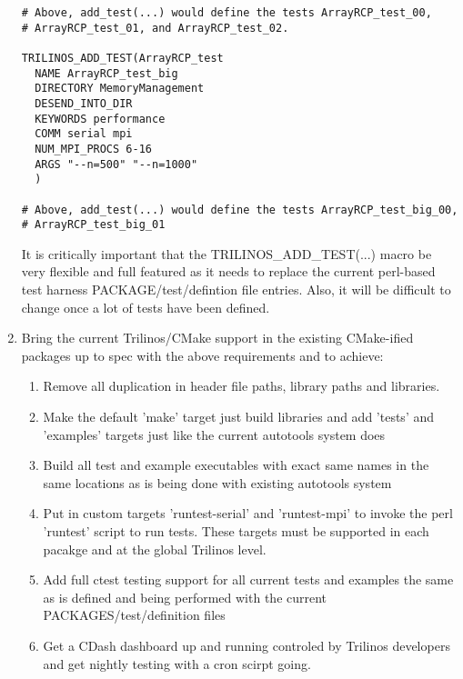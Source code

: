 \documentclass[pdf,ps2pdf,11pt]{SANDreport}
\begin{document}
\begin{enumerate}
\begin{verbatim}
# Above, add_test(...) would define the tests ArrayRCP_test_00,
# ArrayRCP_test_01, and ArrayRCP_test_02.

TRILINOS_ADD_TEST(ArrayRCP_test
  NAME ArrayRCP_test_big
  DIRECTORY MemoryManagement
  DESEND_INTO_DIR
  KEYWORDS performance
  COMM serial mpi
  NUM_MPI_PROCS 6-16
  ARGS "--n=500" "--n=1000"
  )

# Above, add_test(...) would define the tests ArrayRCP_test_big_00,
# ArrayRCP_test_big_01

\end{verbatim}

It is critically important that the TRILINOS\_ADD\_TEST(...) macro be
very flexible and full featured as it needs to replace the current
perl-based test harness PACKAGE/test/defintion file entries.  Also, it
will be difficult to change once a lot of tests have been defined.

{}\item Bring the current Trilinos/CMake support in the existing
CMake-ified packages up to spec with the above requirements and to
achieve:

  \begin{enumerate}

  {}\item Remove all duplication in header file paths, library paths
  and libraries.

  {}\item Make the default 'make' target just build libraries and add
  'tests' and 'examples' targets just like the current autotools
  system does

  {}\item Build all test and example executables with exact same names
  in the same locations as is being done with existing autotools
  system

  {}\item Put in custom targets 'runtest-serial' and 'runtest-mpi' to
  invoke the perl 'runtest' script to run tests.  These targets must
  be supported in each pacakge and at the global Trilinos level.

  {}\item Add full ctest testing support for all current tests and
  examples the same as is defined and being performed with the current
  PACKAGES/test/definition files

  {}\item Get a CDash dashboard up and running controled by Trilinos
  developers and get nightly testing with a cron scirpt going.


\end{enumerate}
\end{enumerate}
\end{document}
